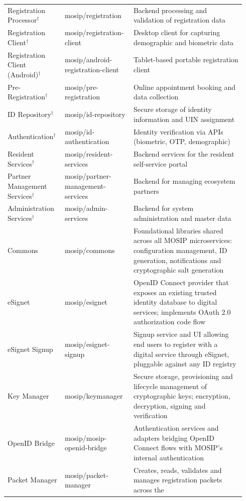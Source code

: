 \begin{longtable}{@{}p{0.235\linewidth}p{0.255\linewidth}p{0.45\linewidth}@{}}
Registration Processor$^{\dagger}$ & mosip/registration &
  Backend processing and validation of registration data \\
Registration Client$^{\dagger}$ & mosip/registration-client &
  Desktop client for capturing demographic and biometric data \\
Registration Client (Android)$^{\dagger}$ & mosip/android-registration-client &
  Tablet-based portable registration client \\
Pre-Registration$^{\dagger}$ & mosip/pre-registration &
  Online appointment booking and data collection \\
ID Repository$^{\dagger}$ & mosip/id-repository &
  Secure storage of identity information and UIN assignment \\
Authentication$^{\dagger}$ & mosip/id-authentication &
  Identity verification via APIs (biometric, OTP, demographic) \\
Resident Services$^{\dagger}$ & mosip/resident-services &
  Backend services for the resident self-service portal \\
Partner Management Services$^{\dagger}$ & mosip/partner-management-services &
  Backend for managing ecosystem partners \\
Administration Services$^{\dagger}$ & mosip/admin-services &
  Backend for system administration and master data \\
\addlinespace
Commons & mosip/commons &
  Foundational libraries shared across all MOSIP microservices: configuration
  management, ID generation, notifications and cryptographic salt generation \\
eSignet & mosip/esignet &
  OpenID Connect provider that exposes an existing trusted identity database
  to digital services; implements OAuth 2.0 authorization code flow \\
eSignet Signup & mosip/esignet-signup &
  Signup service and UI allowing end users to register with a digital service
  through eSignet, pluggable against any ID registry \\
Key Manager & mosip/keymanager &
  Secure storage, provisioning and lifecycle management of cryptographic keys;
  encryption, decryption, signing and verification \\
OpenID Bridge & mosip/mosip-openid-bridge &
  Authentication services and adapters bridging OpenID Connect flows with
  MOSIP's internal authentication \\
Packet Manager & mosip/packet-manager &
  Creates, reads, validates and manages registration packets across the

\end{longtable}
